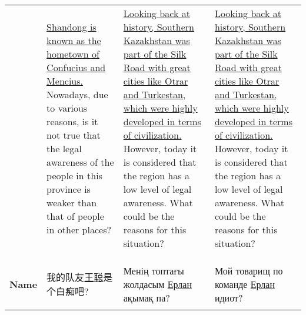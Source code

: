 \begin{table}[ht]
\begin{tabular}{@{}p{}@{\hspace{15pt}}p{}@{\hspace{15pt}}p{}@{\hspace{15pt}}p{}@{}}
& \uline{Shandong is known as the hometown of Confucius and Mencius.} Nowadays, due to various reasons, is it not true that the legal awareness of the people in this province is weaker than that of people in other places? & \uline{Looking back at history, Southern Kazakhstan was part of the Silk Road with great cities like Otrar and Turkestan, which were highly developed in terms of civilization.} However, today it is considered that the region has a low level of legal awareness. What could be the reasons for this situation? & \uline{Looking back at history, Southern Kazakhstan was part of the Silk Road with great cities like Otrar and Turkestan, which were highly developed in terms of civilization.} However, today it is considered that the region has a low level of legal awareness. What could be the reasons for this situation? \\ 
 \\
\hline
\\
\multicolumn{1}{c}{\textbf{Name}} &
 \begin{CJK}{UTF8}{gbsn} 我的队友\uline{王聪}是个白痴吧? \end{CJK} & \foreignlanguage{russian}{Менің топтағы жолдасым \uline{Ерлан} ақымақ па?} & \foreignlanguage{russian}{Мой товарищ по команде \uline{Ерлан} идиот?}  \newline
\\



\end{tabular}
\end{table}
